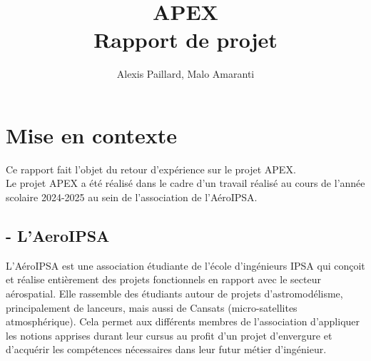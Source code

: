 \documentclass{article}
\title{
    \Huge {\bf APEX} \\
    \huge Rapport de projet\\
}
\author{Alexis Paillard, Malo Amaranti}
\begin{document}
\pagestyle{fancy}
\fancyhf{} %
\renewcommand{\headrulewidth}{0pt} %
\fancyhead[R]{\rightmark}



\maketitle


\newpage


\tableofcontents
\listoffigures

\pagestyle{fancy}
\fancyhf{} %
\renewcommand{\headrulewidth}{0pt} %
\fancyhead[R]{\rightmark}
\fancyfoot[L]{\thepage/\pageref{LastPage}} 

\newpage

\section{Mise en contexte}
Ce rapport fait l'objet du retour d'expérience sur le projet APEX.\\

Le projet APEX a été réalisé dans le cadre d'un travail réalisé au cours de l'année
scolaire 2024-2025 au sein de l'association de l'AéroIPSA.\\

\subsection*{- L'AeroIPSA}
L'AéroIPSA est une association étudiante de l'école d'ingénieurs IPSA qui conçoit et
réalise entièrement des projets fonctionnels en rapport avec le secteur
aérospatial. Elle rassemble des étudiants autour de projets d'astromodélisme,
principalement de lanceurs, mais aussi de Cansats (micro-satellites atmosphérique).
Cela permet aux différents membres de l'association d'appliquer les notions
apprises durant leur cursus au profit d'un projet d'envergure et d'acquérir les
compétences nécessaires dans leur futur métier d'ingénieur.
\end{document}
